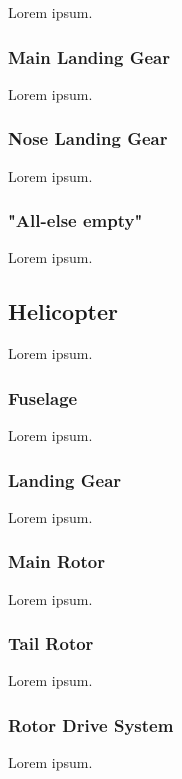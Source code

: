 Lorem ipsum.

\subsubsection{Main Landing Gear}

Lorem ipsum.

\subsubsection{Nose Landing Gear}

Lorem ipsum.

\subsubsection{"All-else empty"}

Lorem ipsum.

\subsection{Helicopter}

Lorem ipsum. \cite{NASA-TP-2015-218751}

\subsubsection{Fuselage}

Lorem ipsum.

\subsubsection{Landing Gear}

Lorem ipsum.

\subsubsection{Main Rotor}

Lorem ipsum.

\subsubsection{Tail Rotor}

Lorem ipsum.

\subsubsection{Rotor Drive System}

Lorem ipsum.

